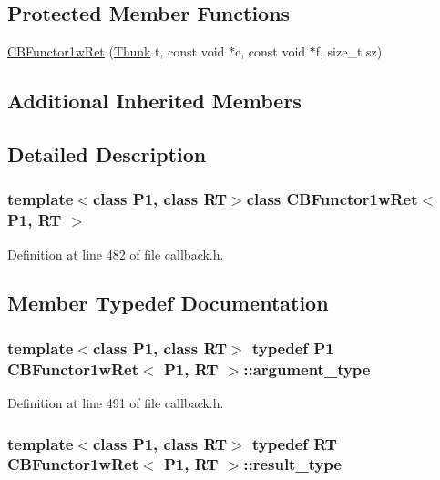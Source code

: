 \subsection*{Protected Member Functions}
\begin{DoxyCompactItemize}
\item 
\hyperlink{class_c_b_functor1w_ret_a7cbe913b648b4940345b8188a50b791d}{C\+B\+Functor1w\+Ret} (\hyperlink{class_c_b_functor1w_ret_a650393fbcb8839fb9e4f077d3ad281e6}{Thunk} t, const void $\ast$c, const void $\ast$f, size\+\_\+t sz)
\end{DoxyCompactItemize}
\subsection*{Additional Inherited Members}


\subsection{Detailed Description}
\subsubsection*{template$<$class P1, class R\+T$>$class C\+B\+Functor1w\+Ret$<$ P1, R\+T $>$}



Definition at line 482 of file callback.\+h.



\subsection{Member Typedef Documentation}
\hypertarget{class_c_b_functor1w_ret_a3b06b725cdb955ad2300fd32c18fabd0}{
\subsubsection[{argument\+\_\+type}]{\setlength{\rightskip}{0pt plus 5cm}template$<$class P1, class R\+T$>$ typedef P1 {\bf C\+B\+Functor1w\+Ret}$<$ P1, R\+T $>$\+::{\bf argument\+\_\+type}}}\label{class_c_b_functor1w_ret_a3b06b725cdb955ad2300fd32c18fabd0}


Definition at line 491 of file callback.\+h.

\hypertarget{class_c_b_functor1w_ret_aedd72816facfbae9a1dc7908b7f9eeef}{
\subsubsection[{result\+\_\+type}]{\setlength{\rightskip}{0pt plus 5cm}template$<$class P1, class R\+T$>$ typedef R\+T {\bf C\+B\+Functor1w\+Ret}$<$ P1, R\+T $>$\+::{\bf result\+\_\+type}}}\label{class_c_b_functor1w_ret_aedd72816facfbae9a1dc7908b7f9eeef}



